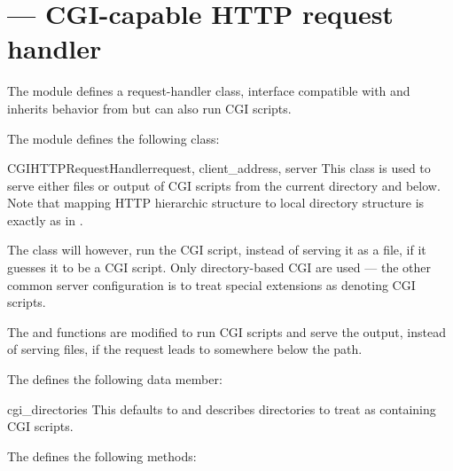 \section{ ---
         CGI-capable HTTP request handler}




The  module defines a request-handler class,
interface compatible with
 and inherits behavior
from  but can also
run CGI scripts.


The  module defines the following class:

\begin{classdesc}{CGIHTTPRequestHandler}{request, client_address, server}
This class is used to serve either files or output of CGI scripts from 
the current directory and below. Note that mapping HTTP hierarchic
structure to local directory structure is exactly as in
.

The class will however, run the CGI script, instead of serving it as a
file, if it guesses it to be a CGI script. Only directory-based CGI
are used --- the other common server configuration is to treat special
extensions as denoting CGI scripts.

The  and  functions are
modified to run CGI scripts and serve the output, instead of serving
files, if the request leads to somewhere below the
 path.
\end{classdesc}

The  defines the following data member:

\begin{memberdesc}{cgi_directories}
This defaults to  and describes
directories to treat as containing CGI scripts.
\end{memberdesc}

The  defines the following methods:

